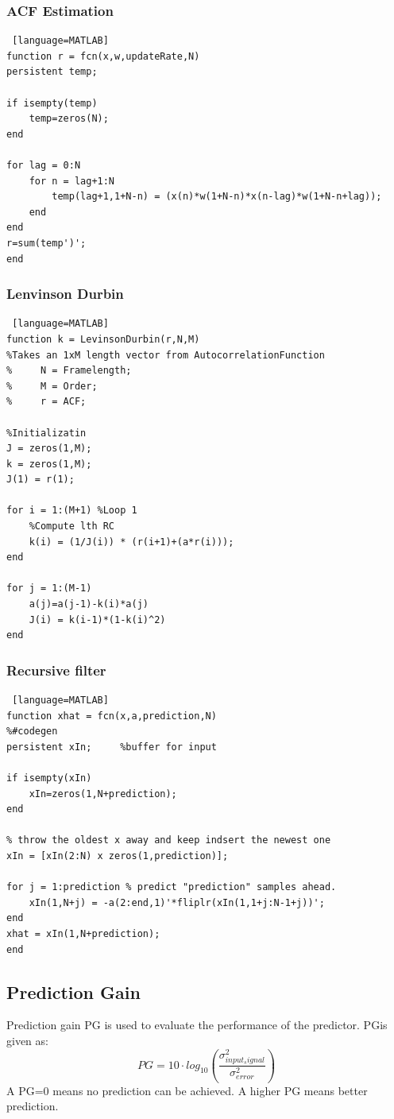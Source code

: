 \subsubsection{ACF Estimation}
\begin{lstlisting} [language=MATLAB]
function r = fcn(x,w,updateRate,N)
persistent temp;

if isempty(temp)
	temp=zeros(N);
end

for lag = 0:N
	for n = lag+1:N
		temp(lag+1,1+N-n) = (x(n)*w(1+N-n)*x(n-lag)*w(1+N-n+lag));
	end
end
r=sum(temp')';
end
\end{lstlisting}

\subsubsection{Lenvinson Durbin}
\begin{lstlisting} [language=MATLAB]
function k = LevinsonDurbin(r,N,M)
%Takes an 1xM length vector from AutocorrelationFunction
%     N = Framelength;
%     M = Order;
%     r = ACF;

%Initializatin
J = zeros(1,M);
k = zeros(1,M);
J(1) = r(1);

for i = 1:(M+1) %Loop 1     
	%Compute lth RC
	k(i) = (1/J(i)) * (r(i+1)+(a*r(i)));
end

for j = 1:(M-1)
	a(j)=a(j-1)-k(i)*a(j)
	J(i) = k(i-1)*(1-k(i)^2)
end
\end{lstlisting}

\subsubsection{Recursive filter}
\begin{lstlisting} [language=MATLAB]
function xhat = fcn(x,a,prediction,N)
%#codegen
persistent xIn;     %buffer for input

if isempty(xIn)
	xIn=zeros(1,N+prediction);
end

% throw the oldest x away and keep indsert the newest one
xIn = [xIn(2:N) x zeros(1,prediction)]; 

for j = 1:prediction % predict "prediction" samples ahead. 
	xIn(1,N+j) = -a(2:end,1)'*fliplr(xIn(1,1+j:N-1+j))';
end
xhat = xIn(1,N+prediction);
end
\end{lstlisting}

\subsection{Prediction Gain}
Prediction gain PG is used to evaluate the performance of the predictor. PGis given as:
\begin{equation}
	PG=10 \cdot log_{10}(\frac{\sigma^2_{input_signal}}{\sigma^2_{error}})
\end{equation} 
A PG=0 means no prediction can be achieved. A higher PG means better prediction.

